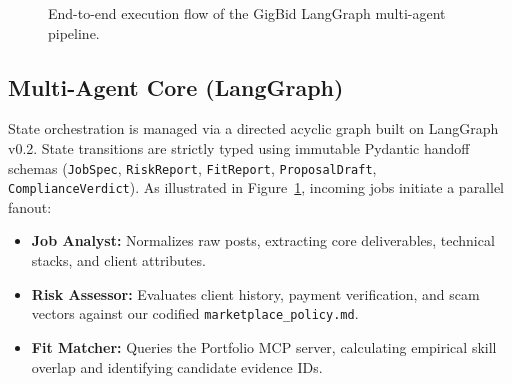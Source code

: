 \documentclass[10pt,a4paper,twocolumn]{article}
\begin{document}
\begin{figure}[t]
\centering
{}
\caption{End-to-end execution flow of the GigBid LangGraph multi-agent pipeline.}
\label{fig:architecture}
\end{figure}

\subsection{Multi-Agent Core (LangGraph)}
State orchestration is managed via a directed acyclic graph built on LangGraph v0.2. State transitions are strictly typed using immutable Pydantic handoff schemas (\texttt{JobSpec}, \texttt{RiskReport}, \texttt{FitReport}, \texttt{ProposalDraft}, \texttt{ComplianceVerdict}). As illustrated in Figure~\ref{fig:architecture}, incoming jobs initiate a parallel fanout:
\begin{itemize}[leftmargin=*,noitemsep]
    \item \textbf{Job Analyst:} Normalizes raw posts, extracting core deliverables, technical stacks, and client attributes.
    \item \textbf{Risk Assessor:} Evaluates client history, payment verification, and scam vectors against our codified \texttt{marketplace\_policy.md}.
    \item \textbf{Fit Matcher:} Queries the Portfolio MCP server, calculating empirical skill overlap and identifying candidate evidence IDs.
\end{itemize}
\end{document}
